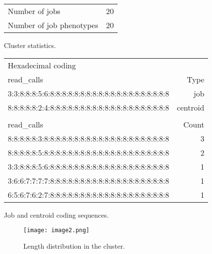 \documentclass{jhps}
\begin{document}
\noindent\begin{minipage}{\textwidth}
\captionsetup{type=table}

\begingroup
  \begin{subtable}{\textwidth}
  \centering
  \begin{tabular}{ll}
    Number of jobs & 20 \\
    Number of job phenotypes & 20 \\
  \end{tabular}
  \caption{Cluster statistics.}
  \label{tab:use_case:hex_native:stats}
  \end{subtable}
\endgroup

\medskip

\begingroup
  \begin{subtable}{\textwidth}
  \centering
  \begin{tiny}
    \begin{tabular}{l|r}
      \rowcolor{tblhead}
      Hexadecimal coding & \\
      \rowcolor{tblhead}
      read\_calls                                           & Type     \\
      \hline
      3:3:8:8:8:5:6:8:8:8:8:8:8:8:8:8:8:8:8:8:8:8:8:8:8:8:8 & job      \\
      8:8:8:8:8:2:4:8:8:8:8:8:8:8:8:8:8:8:8:8:8:8:8:8:8:8:8 & centroid \\
      \multicolumn{2}{l}{}\\
			\rowcolor{tblhead}
      read\_calls                                           & Count    \\
      \hline
      8:8:8:8:8:3:8:8:8:8:8:8:8:8:8:8:8:8:8:8:8:8:8:8:8:8:8 & 3        \\
      8:8:8:8:8:5:8:8:8:8:8:8:8:8:8:8:8:8:8:8:8:8:8:8:8:8:8 & 2        \\
      3:3:8:8:8:5:6:8:8:8:8:8:8:8:8:8:8:8:8:8:8:8:8:8:8:8:8 & 1        \\
      3:6:6:7:7:7:7:8:8:8:8:8:8:8:8:8:8:8:8:8:8:8:8:8:8:8:8 & 1        \\
      6:5:6:7:6:2:7:8:8:8:8:8:8:8:8:8:8:8:8:8:8:8:8:8:8:8:8 & 1        \\
    \end{tabular}
  \end{tiny}
  \caption{Job and centroid coding sequences.}
  \label{tab:use_case:hex_native:job_centroid}
  \end{subtable}
\endgroup

\medskip

\begingroup
  \begin{subfigure}{\textwidth}
  \centering
  \texttt{[image: image2.png]}
  \caption{Length distribution in the cluster.}
  \label{fig:use_case:hex_native:length}
  \end{subfigure}
\endgroup

\label{fig:use_case:hex_native}
\end{minipage}
\end{document}
